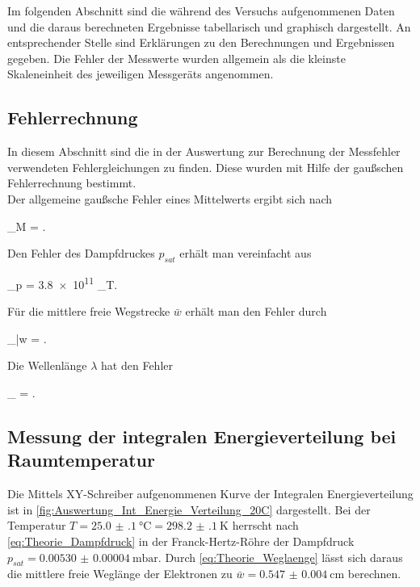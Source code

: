 Im folgenden Abschnitt sind die während des Versuchs aufgenommenen Daten 
und die daraus berechneten Ergebnisse tabellarisch und graphisch dargestellt.
An entsprechender Stelle sind Erklärungen zu den Berechnungen
und Ergebnissen gegeben. Die Fehler der Messwerte wurden allgemein als die 
kleinste Skaleneinheit des jeweiligen Messgeräts angenommen.

\subsection{Fehlerrechnung}\label{sec:Fehlerrechnung}
	
	In diesem Abschnitt sind die in der Auswertung zur Berechnung der
	Messfehler verwendeten Fehlergleichungen zu finden. Diese wurden
	mit Hilfe der gaußschen Fehlerrechnung bestimmt.\\
	
	Der allgemeine gaußsche Fehler eines Mittelwerts ergibt sich nach
	\begin{errorEquation}
		\sigma_{M} =  .
		 \label{std:Mittel}
	\end{errorEquation}
	
	Den Fehler des Dampfdruckes $p_{sat}$ erhält man vereinfacht aus
	\begin{errorEquation}
		\sigma_{p} = \num{3.8e11}  \cdot {} \cdot \sigma_{T}.
	    \label{std:Dampfdruck}
	\end{errorEquation}  
	
	Für die mittlere freie Wegstrecke $\bar{w}$ erhält man den Fehler durch
	\begin{errorEquation}
		\sigma_{\bar{w}} =  .
    \label{std:Wegstrecke}
	\end{errorEquation}  

	Die Wellenlänge $\lambda$ hat den Fehler
	\begin{errorEquation}
		\sigma_{\lambda} =  .
		 \label{std:Wellenlänge}
	\end{errorEquation}  
	

\subsection{Messung der integralen Energieverteilung bei Raumtemperatur}
	
	Die Mittels XY-Schreiber aufgenommenen Kurve der Integralen Energieverteilung ist 
	in \cref{fig:Auswertung_Int_Energie_Verteilung_20C} dargestellt. Bei der Temperatur
	$T =\SI{25.0(1)}{\degreeCelsius} = \SI{298.2(1)}{\kelvin}$ herrscht nach \cref{eq:Theorie_Dampfdruck} in der 
	Franck-Hertz-Röhre der Dampfdruck $p_{sat} = \SI{0.00530(4)}{\milli\bar}$. Durch \cref{eq:Theorie_Weglaenge}
	lässt sich daraus die mittlere freie Weglänge der Elektronen zu $\bar{w} = \SI{0.547(4)}{\cm}$ berechnen.
	

